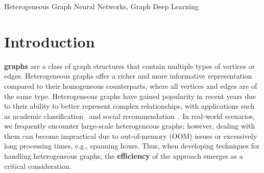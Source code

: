 \documentclass[lettersize,journal]{IEEEtran}
\begin{document}
\begin{IEEEkeywords}
Heterogeneous Graph Neural Networks, Graph Deep Learning
\end{IEEEkeywords}






\section{Introduction}\label{sec:intro}






 \textbf{graphs} are a class of graph structures that contain multiple types of vertices or edges. 
Heterogeneous graphs offer a richer and more informative representation compared to their homogeneous counterparts, where all vertices and edges are of the same type.
Heterogeneous graphs have gained popularity in recent years due to their ability to better represent complex relationships, with applications such as academic classification~\cite{9950622,DBLP:conf/kdd/HuDWCS20,DBLP:conf/kdd/BojchevskiKPKBR20,yu2022labelenhanced} and social recommendation~\cite{9415142,DBLP:journals/tkde/LiWLS22,DBLP:conf/wsdm/ChenHXWXL23}.
In real-world scenarios, we frequently encounter large-scale heterogeneous graphs; however, dealing with them can become impractical due to out-of-memory (OOM) issues or excessively long processing times, e.g., spanning hours.
Thus, when developing techniques for handling heterogeneous graphs, the \textbf{efficiency} of the approach emerges as a critical consideration.
\end{document}
